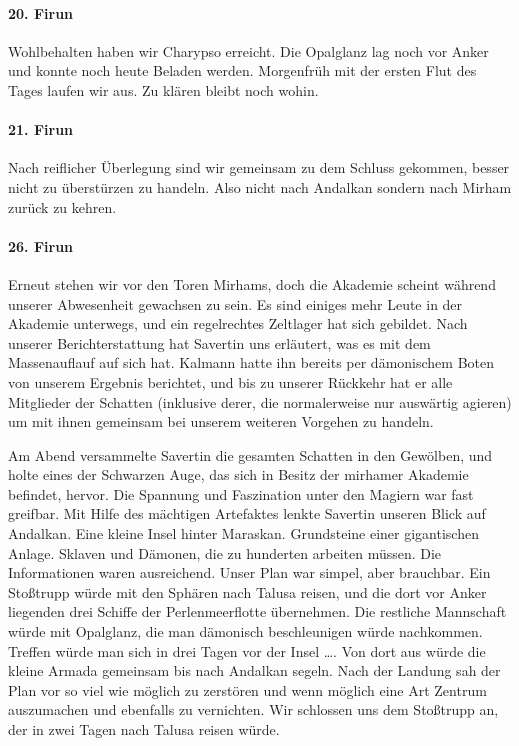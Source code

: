 \paragraph{20. Firun}
Wohlbehalten haben wir Charypso erreicht. Die Opalglanz lag noch vor Anker und konnte noch heute Beladen werden. Morgenfrüh mit der ersten Flut des Tages laufen wir aus. Zu klären bleibt noch wohin.

\paragraph{21. Firun}
Nach reiflicher Überlegung sind wir gemeinsam zu dem Schluss gekommen, besser nicht zu überstürzen zu handeln. Also nicht nach Andalkan sondern nach Mirham zurück zu kehren.

\paragraph{26. Firun}
Erneut stehen wir vor den Toren Mirhams, doch die Akademie scheint während unserer Abwesenheit gewachsen zu sein. Es sind einiges mehr Leute in der Akademie unterwegs, und ein regelrechtes Zeltlager hat sich gebildet.
Nach unserer Berichterstattung hat Savertin uns erläutert, was es mit dem Massenauflauf auf sich hat. Kalmann hatte ihn bereits per dämonischem Boten von unserem Ergebnis berichtet, und bis zu unserer Rückkehr hat er alle Mitglieder der Schatten (inklusive derer, die normalerweise nur auswärtig agieren) um mit ihnen gemeinsam bei unserem weiteren Vorgehen zu handeln.

Am Abend versammelte Savertin die gesamten Schatten in den Gewölben, und holte eines der Schwarzen Auge, das sich in Besitz der mirhamer Akademie befindet, hervor. Die Spannung und Faszination unter den Magiern war fast greifbar. Mit Hilfe des mächtigen Artefaktes lenkte Savertin unseren Blick auf Andalkan. Eine kleine Insel hinter Maraskan. Grundsteine einer gigantischen Anlage. Sklaven und Dämonen, die zu hunderten arbeiten müssen. Die Informationen waren ausreichend. Unser Plan war simpel, aber brauchbar. Ein Stoßtrupp würde mit den Sphären nach Talusa reisen, und die dort vor Anker liegenden drei Schiffe der Perlenmeerflotte übernehmen. Die restliche Mannschaft würde mit Opalglanz, die man dämonisch beschleunigen würde nachkommen. Treffen würde man sich in drei Tagen vor der Insel \dots . Von dort aus würde die kleine Armada gemeinsam bis nach Andalkan segeln. Nach der Landung sah der Plan vor so viel wie möglich zu zerstören und wenn möglich eine Art Zentrum auszumachen und ebenfalls zu vernichten. Wir schlossen uns dem Stoßtrupp an, der in zwei Tagen nach Talusa reisen würde.

